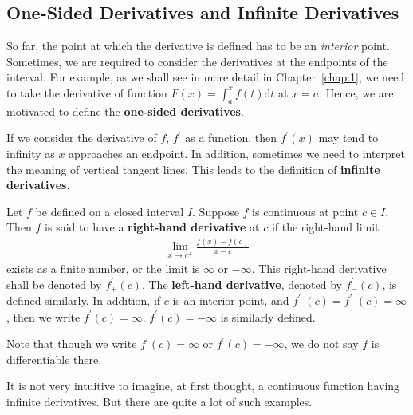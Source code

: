 \documentclass[thmcnt=section, 12pt]{my-elegantbook}
\begin{document}

\subsection{One-Sided Derivatives and Infinite Derivatives}

So far, the point at which the derivative is defined has to be an \textit{interior} point. Sometimes, we are required to consider the derivatives at the endpoints of the interval. For example, as we shall see in more detail in Chapter~\ref{chap:1}, we need to take the derivative of function $F(x) = \int_a^x f(t) \mathrm{d}t$ at $x=a$. Hence, we are motivated to define the \textbf{one-sided derivatives}.

If we consider the derivative of $f$, $f^\prime$ as a function, then $f^\prime(x)$ may tend to infinity as $x$ approaches an endpoint. In addition, sometimes we need to interpret the meaning of vertical tangent lines. This leads to the definition of \textbf{infinite derivatives}.

\begin{definition}
    Let $f$ be defined on a closed interval $I$. Suppose $f$ is continuous at point $c \in I$. Then $f$ is said to have a \textbf{right-hand derivative} at $c$ if the right-hand limit
    \begin{align*}
        \lim_{x \to c^{+}} \frac{f(x) - f(c)}{x - c}
    \end{align*}
    exists as a finite number, or the limit is $\infty$ or $-\infty$. This right-hand derivative shall be denoted by $f^\prime_{+}(c)$. The \textbf{left-hand derivative}, denoted by $f^\prime_{-}(c)$, is defined similarly. In addition, if $c$ is an interior point, and $f^\prime_{+}(c) = f^\prime_{-}(c) = \infty$, then we write $f^\prime(c) = \infty$. $f^\prime(c) = -\infty$ is similarly defined.
\end{definition}

\begin{remark}
    Note that though we write $f^\prime(c) = \infty$ or $f^\prime(c) = -\infty$, we do not say $f$ is differentiable there.
\end{remark}

It is not very intuitive to imagine, at first thought, a continuous function having infinite derivatives. But there are quite a lot of such examples.
\end{document}

